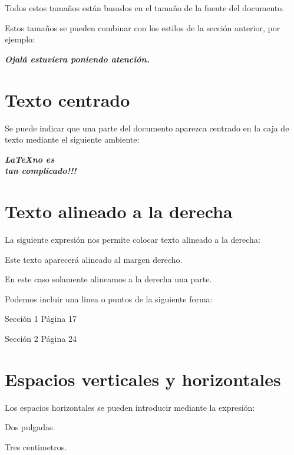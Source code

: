 \documentclass[letterpaper,12pt]{article}
\begin{document}
Todos estos tamaños están basados en el tamaño de la fuente del documento.

Estos tamaños se pueden combinar con los estilos de la sección anterior, por ejemplo:

\medskip

\begin{Large}
\textbf{\textit{Ojalá estuviera poniendo atención.}}
\end{Large}

\section{Texto centrado}

Se puede indicar que una parte del documento aparezca centrado en la caja de texto mediante el siguiente ambiente:

\begin{center}
\LARGE{\textbf{\textit{\LaTeX no es \\ tan complicado!!!}}}
\end{center}

\section{Texto alineado a la derecha}

La siguiente expresión nos permite colocar texto alineado a la derecha:

\hfill Este texto aparecerá alineado al margen derecho.

\bigskip

En este caso solamente alineamos a la derecha \hfill una parte.

Podemos incluir una linea o puntos de la siguiente forma:

\bigskip

Sección 1 \hrulefill Página 17

\bigskip

Sección 2 \dotfill Página 24

\section{Espacios verticales y horizontales}

Los espacios horizontales se pueden introducir mediante la expresión:

\hspace{2in}Dos pulgadas.

\hspace{3cm}Tres centimetros.
\end{document}
